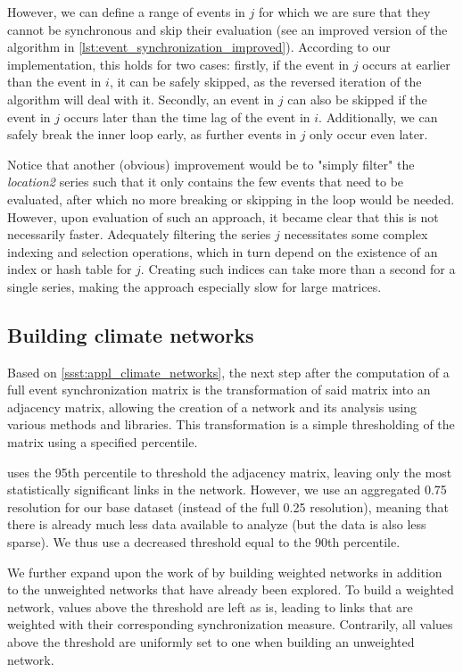 However, we can define a range of events in $j$ for which we are sure that they cannot be synchronous and skip their evaluation (see an improved version of the algorithm in \cref{lst:event_synchronization_improved}). According to our implementation, this holds for two cases: firstly, if the event in $j$ occurs at earlier than the event in $i$, it can be safely skipped, as the reversed iteration of the algorithm will deal with it. Secondly, an event in $j$ can also be skipped if the event in $j$ occurs later than the time lag of the event in $i$. Additionally, we can safely break the inner loop early, as further events in $j$ only occur even later.

Notice that another (obvious) improvement would be to "simply filter" the \textit{location2} series such that it only contains the few events that need to be evaluated, after which no more breaking or skipping in the loop would be needed. However, upon evaluation of such an approach, it became clear that this is not necessarily faster. Adequately filtering the series $j$ necessitates some complex indexing and selection operations, which in turn depend on the existence of an index or hash table for $j$. Creating such indices can take more than a second for a single series, making the approach especially slow for large matrices.

\subsection{Building climate networks}
\label{sst:building_climate_network}
Based on \cref{ssst:appl_climate_networks}, the next step after the computation of a full event synchronization matrix is the transformation of said matrix into an adjacency matrix, allowing the creation of a network and its analysis using various methods and libraries. This transformation is a simple thresholding of the matrix using a specified percentile.

\citet{Stolbova.2015} uses the 95th percentile to threshold the adjacency matrix, leaving only the most statistically significant links in the network. However, we use an aggregated {0.75\degree} resolution for our base dataset (instead of the full {0.25\degree} resolution), meaning that there is already much less data available to analyze (but the data is also less sparse). We thus use a decreased threshold equal to the 90th percentile.

We further expand upon the work of \citet{Stolbova.2015} by building weighted networks in addition to the unweighted networks that have already been explored. To build a weighted network, values above the threshold are left as is, leading to links that are weighted with their corresponding synchronization measure. Contrarily, all values above the threshold are uniformly set to one when building an unweighted network.


